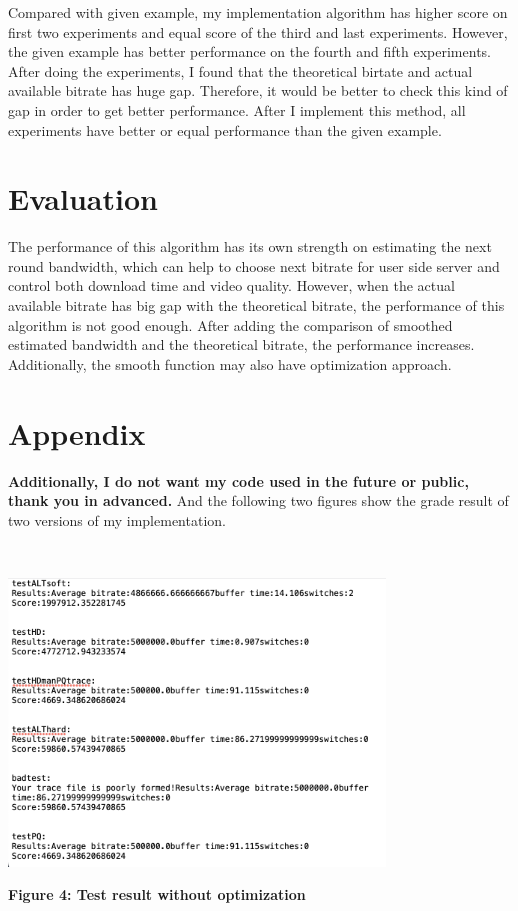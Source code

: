 Compared with given example, my implementation algorithm has higher score on first two experiments and equal score of the third and last experiments. However, the given example has better performance on the fourth and fifth experiments. After doing the experiments, I found that the theoretical birtate and actual available bitrate has huge gap. Therefore, it would be better to check this kind of gap in order to get better performance. After I implement this method, all experiments have better or equal performance than the given example.

\section{Evaluation}

The performance of this algorithm has its own strength on estimating the next round bandwidth, which can help to choose next bitrate for user side server and control both download time and video quality. However, when the actual available bitrate has big gap with the theoretical bitrate, the performance of this algorithm is not good enough. After adding the comparison of smoothed estimated bandwidth and the theoretical bitrate, the performance increases. Additionally, the smooth function may also have optimization approach.

\section{Appendix}

\textbf {Additionally, I do not want my code used in the future or public, thank you in advanced.} And the following two figures show the grade result of two versions of my implementation.

~\\
\centerline {\includegraphics[scale = 1, width=10cm]{imp1}}
\centerline{\textbf {Figure 4: Test result without optimization}}

